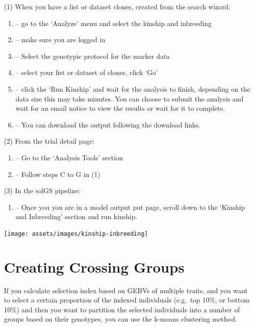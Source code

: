 \documentclass[
  12pt,
]{book}
\providecommand{\tightlist}{%
  \setlength{\itemsep}{0pt}\setlength{\parskip}{0pt}}
\begin{document}
(1) When you have a list or dataset clones, created from the search wizard:

\begin{enumerate}
\def\labelenumi{(\Alph{enumi})}
\item
  -- go to the `Analyze' menu and select the kinship and inbreeding
\item
  -- make sure you are logged in
\item
  -- Select the genotypic protocol for the marker data
\item
  -- select your list or dataset of clones, click `Go'
\item
  -- click the `Run Kinship' and wait for the analysis to finish, depending on the data size this may take minutes. You can choose to submit the analysis and wait for an email notice to view the results or wait for it to complete.
\item
  -- You can download the output following the download links.
\end{enumerate}

(2) From the trial detail page:

\begin{enumerate}
\def\labelenumi{(\Alph{enumi})}
\item
  -- Go to the `Analysis Tools' section
\item
  -- Follow steps C to G in (1)
\end{enumerate}

(3) In the solGS pipeline:

\begin{enumerate}
\def\labelenumi{(\Alph{enumi})}
\tightlist
\item
  -- Once you you are in a model output put page, scroll down to the `Kinship and Inbreeding' section and run kinship.
\end{enumerate}

\begin{center}\texttt{[image: assets/images/kinship-inbreeding]} \end{center}

\hypertarget{creating-crossing-groups}{%
\section{Creating Crossing Groups}\label{creating-crossing-groups}}

If you calculate selection index based on GEBVs of multiple traits, and you want to select a certain proportion of the indexed individuals (e.g.~top 10\%, or bottom 10\%) and then you want to partition the selected individuals into a number of groups based on their genotypes, you can use the k-means clustering method.
\end{document}
